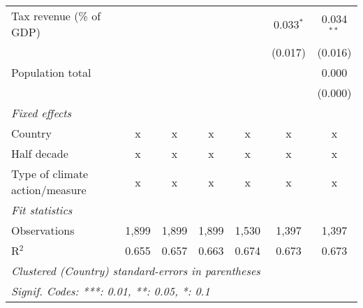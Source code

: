 \begin{tabular}{lcccccc}
   Tax revenue (\% of GDP)                    &         &              &                &                & 0.033$^{*}$    & 0.034$^{**}$\\   
                                              &         &              &                &                & (0.017)        & (0.016)\\   
   Population total                           &         &              &                &                &                & 0.000\\   
                                              &         &              &                &                &                & (0.000)\\   
   \emph{Fixed effects}\\
   Country                                    & x       & x            & x              & x              & x              & x\\  
   Half decade                                & x       & x            & x              & x              & x              & x\\  
   Type of climate action/measure             & x       & x            & x              & x              & x              & x\\  
   \midrule \emph{Fit statistics}\\
   Observations                               & 1,899   & 1,899        & 1,899          & 1,530          & 1,397          & 1,397\\  
   R$^2$                                      & 0.655   & 0.657        & 0.663          & 0.674          & 0.673          & 0.673\\  
   \midrule
   \multicolumn{7}{l}{\emph{Clustered (Country) standard-errors in parentheses}}\\
   \multicolumn{7}{l}{\emph{Signif. Codes: ***: 0.01, **: 0.05, *: 0.1}}\\
\end{tabular}
\par\endgroup


